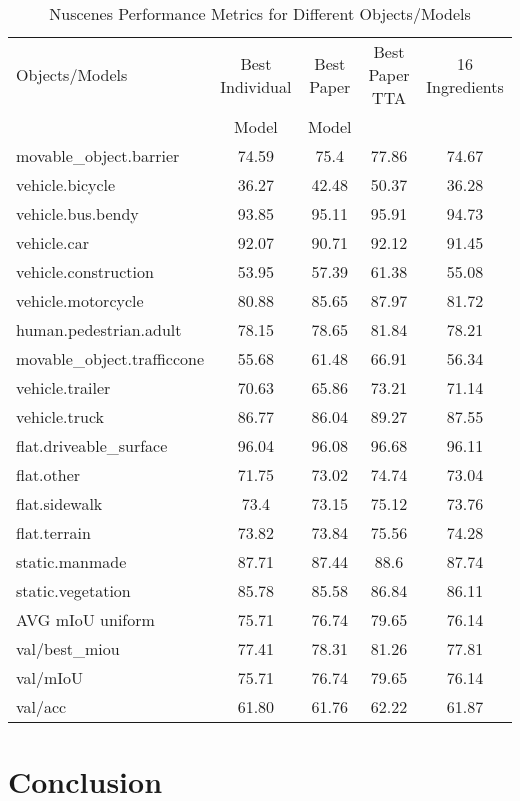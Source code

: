 \documentclass[10pt,twocolumn,letterpaper]{article}
\begin{document}
\begin{table}[htbp]
	\centering
	\small
	\caption{Nuscenes Performance Metrics for Different Objects/Models}
	\begin{tabular}{lcccc}
		\toprule
		Objects/Models & Best Individual & Best Paper & Best Paper TTA & 16 Ingredients \\
		& Model & Model & & \\
		\midrule
		movable\_object.barrier & 74.59 & 75.4 & 77.86 & 74.67 \\
		vehicle.bicycle & 36.27 & 42.48 & 50.37 & 36.28 \\
		vehicle.bus.bendy & 93.85 & 95.11 & 95.91 & 94.73 \\
		vehicle.car & 92.07 & 90.71 & 92.12 & 91.45 \\
		vehicle.construction & 53.95 & 57.39 & 61.38 & 55.08 \\
		vehicle.motorcycle & 80.88 & 85.65 & 87.97 & 81.72 \\
		human.pedestrian.adult & 78.15 & 78.65 & 81.84 & 78.21 \\
		movable\_object.trafficcone & 55.68 & 61.48 & 66.91 & 56.34 \\
		vehicle.trailer & 70.63 & 65.86 & 73.21 & 71.14 \\
		vehicle.truck & 86.77 & 86.04 & 89.27 & 87.55 \\
		flat.driveable\_surface & 96.04 & 96.08 & 96.68 & 96.11 \\
		flat.other & 71.75 & 73.02 & 74.74 & 73.04 \\
		flat.sidewalk & 73.4 & 73.15 & 75.12 & 73.76 \\
		flat.terrain & 73.82 & 73.84 & 75.56 & 74.28 \\
		static.manmade & 87.71 & 87.44 & 88.6 & 87.74 \\
		static.vegetation & 85.78 & 85.58 & 86.84 & 86.11 \\
		\midrule
		AVG mIoU uniform & 75.71 & 76.74 & 79.65 & 76.14 \\
		val/best\_miou & 77.41 & 78.31 & 81.26 & 77.81 \\
		val/mIoU & 75.71 & 76.74 & 79.65 & 76.14 \\
		val/acc & 61.80 & 61.76 & 62.22 & 61.87 \\
		\bottomrule
	\end{tabular}
\end{table}

\section{Conclusion}
\end{document}
